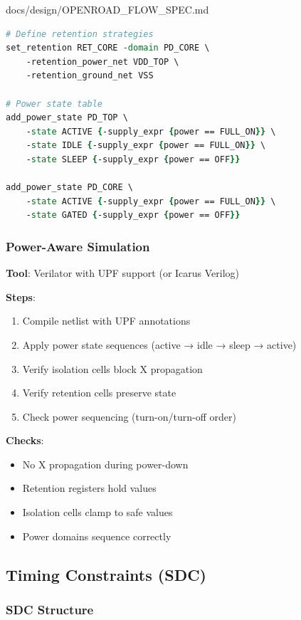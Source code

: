 \begin{relocated}{docs/design/OPENROAD_FLOW_SPEC.md}
\begin{lstlisting}[language=tcl]
# Define retention strategies
set_retention RET_CORE -domain PD_CORE \
    -retention_power_net VDD_TOP \
    -retention_ground_net VSS

# Power state table
add_power_state PD_TOP \
    -state ACTIVE {-supply_expr {power == FULL_ON}} \
    -state IDLE {-supply_expr {power == FULL_ON}} \
    -state SLEEP {-supply_expr {power == OFF}}

add_power_state PD_CORE \
    -state ACTIVE {-supply_expr {power == FULL_ON}} \
    -state GATED {-supply_expr {power == OFF}}
\end{lstlisting}

\subsubsection{Power-Aware Simulation}\label{tm:pd:openroad-flow:power-aware-simulation}

\textbf{Tool}: Verilator with UPF support (or Icarus Verilog)

\textbf{Steps}:

\begin{enumerate}
\def\labelenumi{\arabic{enumi}.}
\tightlist
\item
  Compile netlist with UPF annotations
\item
  Apply power state sequences (active → idle → sleep → active)
\item
  Verify isolation cells block X propagation
\item
  Verify retention cells preserve state
\item
  Check power sequencing (turn-on/\allowbreak{}turn-off order)
\end{enumerate}

\textbf{Checks}:

\begin{itemize}
\item
  No X propagation during power-down
\item
  Retention registers hold values
\item
  Isolation cells clamp to safe values
\item
  Power domains sequence correctly
\end{itemize}

\subsection{Timing Constraints (SDC)}\label{tm:pd:openroad-flow:timing-constraints-sdc}

\subsubsection{SDC Structure}\label{tm:pd:openroad-flow:sdc-structure}


\end{relocated}
